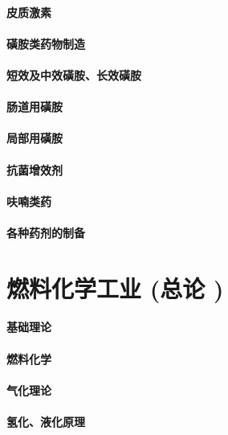 \documentclass[UTF8]{../../ApplicationUniverse}
\begin{document}
        \subsubsection{皮质激素}
\subsubsection{磺胺类药物制造}
    \subsubsection{短效及中效磺胺、长效磺胺}
    \subsubsection{肠道用磺胺}
    \subsubsection{局部用磺胺}
    \subsubsection{抗菌增效剂}
    \subsubsection{呋喃类药}
\subsubsection{各种药剂的制备}




 

\chapter{燃料化学工业 (总论 )}
\subsubsection{基础理论}
    \subsubsection{燃料化学}
    \subsubsection{气化理论}
    \subsubsection{氢化、液化原理}
\end{document}
